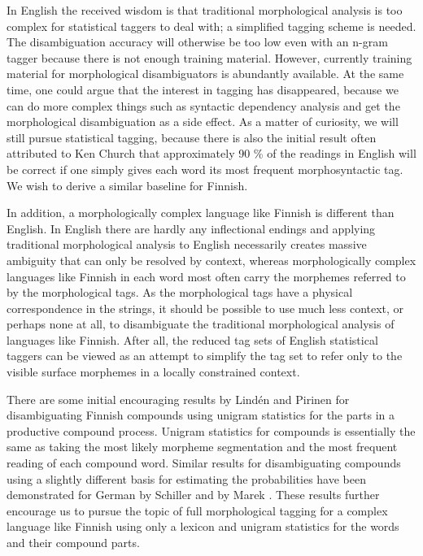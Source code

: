 \documentclass[a4paper]{article}
\begin{document}
In English the received wisdom is that traditional morphological
analysis is too complex for statistical taggers to deal with; a
simplified tagging scheme is needed. The disambiguation accuracy will
otherwise be too low even with an n-gram tagger because there is not
enough training material. However, currently training material for
morphological disambiguators is abundantly available. At the same
time, one could argue that the interest in tagging has disappeared,
because we can do more complex things such as syntactic dependency
analysis and get the morphological disambiguation as a side effect. As
a matter of curiosity, we will still pursue statistical tagging,
because there is also the initial result often attributed to Ken
Church that approximately 90 \% of the readings in English will be
correct if one simply gives each word its most frequent
morphosyntactic tag. We wish to derive a similar baseline for Finnish.

In addition, a morphologically complex language like Finnish is
different than English. In English there are hardly any inflectional
endings and applying traditional morphological analysis to English
necessarily creates massive ambiguity that can only be resolved by
context, whereas morphologically complex languages like Finnish in
each word most often carry the morphemes referred to by the
morphological tags. As the morphological tags have a physical
correspondence in the strings, it should be possible to use much less
context, or perhaps none at all, to disambiguate the traditional
morphological analysis of languages like Finnish. After all, the
reduced tag sets of English statistical taggers can be viewed as an
attempt to simplify the tag set to refer only to the visible surface
morphemes in a locally constrained context.

There are some initial encouraging results by Lindén and Pirinen
\cite{linden09nodalida} for disambiguating Finnish compounds using
unigram statistics for the parts in a productive compound process.
Unigram statistics for compounds is essentially the same as taking the
most likely morpheme segmentation and the most frequent reading of
each compound word. Similar results for disambiguating compounds using
a slightly different basis for estimating the probabilities have been
demonstrated for German by Schiller \cite{schiller2005} and by Marek
\cite{marek2006}. These results further encourage us to pursue the
topic of full morphological tagging for a complex language like
Finnish using only a lexicon and unigram statistics for the words and
their compound parts.
\end{document}
